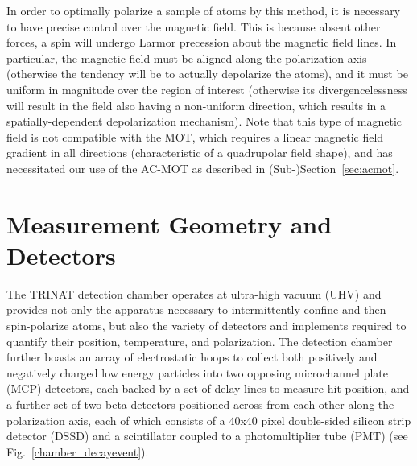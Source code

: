 

In order to optimally polarize a sample of atoms by this method, it is necessary to have precise control over the magnetic field.  This is because absent other forces, a spin will undergo Larmor precession about the magnetic field lines.  In particular, the magnetic field must be aligned along the polarization axis (otherwise the tendency will be to actually depolarize the atoms), and it must be uniform in magnitude over the region of interest (otherwise its divergencelessness will result in the field also having a non-uniform direction, which results in a spatially-dependent depolarization mechanism).  Note that this type of magnetic field is not compatible with the MOT, which requires a linear magnetic field gradient in all directions (characteristic of a quadrupolar field shape), and has necessitated our use of the AC-MOT as described in (Sub-)Section~\ref{sec:acmot}. 




\section{Measurement Geometry and Detectors}
\label{sec:geometry}

The TRINAT detection chamber operates at ultra-high vacuum (UHV) and provides not only the apparatus necessary to intermittently confine and then spin-polarize atoms, but also the variety of detectors and implements required to quantify their position, temperature, and polarization.  The detection chamber further boasts an array of electrostatic hoops to collect both positively and negatively charged low energy particles into two opposing microchannel plate (MCP) detectors, each backed by a set of delay lines to measure hit position, and a further set of two beta detectors positioned across from each other along the polarization axis, each of which consists of a 40x40 pixel double-sided silicon strip detector (DSSD) and a scintillator coupled to a photomultiplier tube (PMT) (see Fig.~\ref{chamber_decayevent}). 

